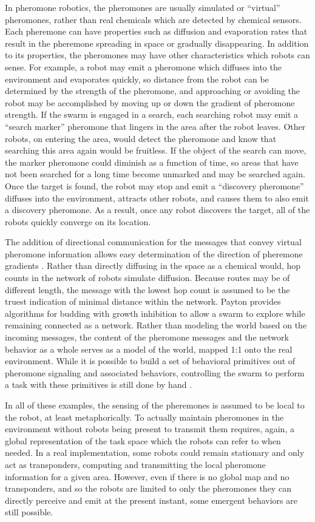 \documentclass[]{article}
\begin{document}
In pheromone robotics, the pheromones are usually simulated or ``virtual'' pheromones, rather than real chemicals which are detected by chemical sensors. 
Each pheremone can have properties such as diffusion and evaporation rates that result in the pheremone spreading in space or gradually disappearing. 
In addition to its properties, the pheromones may have other characteristics which robots can sense. 
For example, a robot may emit a pheromone which diffuses into the environment and evaporates quickly, so distance from the robot can be determined by the strength of the pheromone, and approaching or avoiding the robot may be accomplished by moving up or down the gradient of pheromone strength. 
If the swarm is engaged in a search, each searching robot may emit a ``search marker'' pheromone that lingers in the area after the robot leaves. 
Other robots, on entering the area, would detect the pheromone and know that searching this area again would be fruitless. 
If the object of the search can move, the marker pheromone could diminish as a function of time, so areas that have not been searched for a long time become unmarked and may be searched again. 
Once the target is found, the robot may stop and emit a ``discovery pheromone'' diffuses into the environment, attracts other robots, and causes them to also emit a discovery pheromone. 
As a result, once any robot discovers the target, all of the robots quickly converge on its location. 

The addition of directional communication for the messages that convey virtual pheromone information allows easy determination of the direction of pheremone gradients \cite{payton2001pheromone}.
Rather than directly diffusing in the space as a chemical would, hop counts in the network of robots simulate diffusion. 
Because routes may be of different length, the message with the lowest hop count is assumed to be the truest indication of minimal distance within the network. 
Payton provides algorithms for budding with growth inhibition to allow a swarm to explore while remaining connected as a network. 
Rather than modeling the world based on the incoming messages, the content of the pheromone messages and the network behavior as a whole serves as a model of the world, mapped 1:1 onto the real environment. 
While it is possible to build a set of behavioral primitives out of pheromone signaling and associated behaviors, controlling the swarm to perform a task with these primitives is still done by hand \cite{payton2003compound}.

In all of these examples, the sensing of the pheremones is assumed to be local to the robot, at least metaphorically. 
To actually maintain pheromones in the environment without robots being present to transmit them requires, again, a global representation of the task space which the robots can refer to when needed. 
In a real implementation, some robots could remain stationary and only act as transponders, computing and transmitting the local pheromone information for a given area. 
However, even if there is no global map and no transponders, and so the robots are limited to only the pheromones they can directly perceive and emit at the present instant, some emergent behaviors are still possible. 
\end{document}
